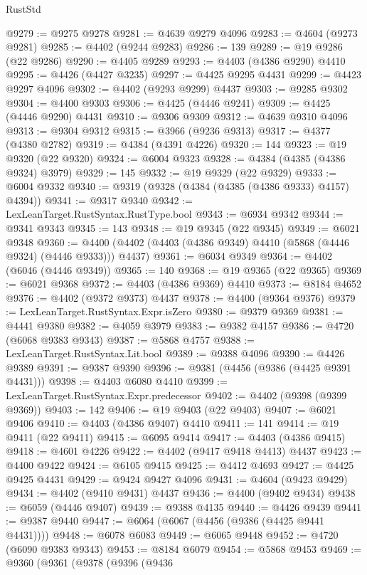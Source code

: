 \begin{lexlean}{RustStd}
\begin{coremodule}
@9279 := @9275 @9278
@9281 := @4639 @9279 @4096
@9283 := @4604 (@9273 @9281)
@9285 := @4402 (@9244 @9283)
@9286 := 139
@9289 := @19 @9286 (@22 @9286)
@9290 := @4405 @9289
@9293 := @4403 (@4386 @9290) @4410
@9295 := @4426 (@4427 @3235)
@9297 := @4425 @9295 @4431
@9299 := @4423 @9297 @4096
@9302 := @4402 (@9293 @9299) @4437
@9303 := @9285 @9302
@9304 := @4400 @9303
@9306 := @4425 (@4446 @9241)
@9309 := @4425 (@4446 @9290) @4431
@9310 := @9306 @9309
@9312 := @4639 @9310 @4096
@9313 := @9304 @9312
@9315 := @3966 (@9236 @9313)
@9317 := @4377 (@4380 @2782)
@9319 := @4384 (@4391 @4226)
@9320 := 144
@9323 := @19 @9320 (@22 @9320)
@9324 := @6004 @9323
@9328 := @4384 (@4385 (@4386 @9324) @3979)
@9329 := 145
@9332 := @19 @9329 (@22 @9329)
@9333 := @6004 @9332
@9340 := @9319 (@9328 (@4384 (@4385 (@4386 @9333) @4157) @4394))
@9341 := @9317 @9340
@9342 := LexLeanTarget.RustSyntax.RustType.bool
@9343 := @6934 @9342
@9344 := @9341 @9343
@9345 := 143
@9348 := @19 @9345 (@22 @9345)
@9349 := @6021 @9348
@9360 := @4400 (@4402 (@4403 (@4386 @9349) @4410 (@5868 (@4446 @9324) (@4446 @9333))) @4437)
@9361 := @6034 @9349
@9364 := @4402 (@6046 (@4446 @9349))
@9365 := 140
@9368 := @19 @9365 (@22 @9365)
@9369 := @6021 @9368
@9372 := @4403 (@4386 @9369) @4410
@9373 := @8184 @4652
@9376 := @4402 (@9372 @9373) @4437
@9378 := @4400 (@9364 @9376)
@9379 := LexLeanTarget.RustSyntax.Expr.isZero
@9380 := @9379 @9369
@9381 := @4441 @9380
@9382 := @4059 @3979
@9383 := @9382 @4157
@9386 := @4720 (@6068 @9383 @9343)
@9387 := @5868 @4757
@9388 := LexLeanTarget.RustSyntax.Lit.bool
@9389 := @9388 @4096
@9390 := @4426 @9389
@9391 := @9387 @9390
@9396 := @9381 (@4456 (@9386 (@4425 @9391 @4431)))
@9398 := @4403 @6080 @4410
@9399 := LexLeanTarget.RustSyntax.Expr.predecessor
@9402 := @4402 (@9398 (@9399 @9369))
@9403 := 142
@9406 := @19 @9403 (@22 @9403)
@9407 := @6021 @9406
@9410 := @4403 (@4386 @9407) @4410
@9411 := 141
@9414 := @19 @9411 (@22 @9411)
@9415 := @6095 @9414
@9417 := @4403 (@4386 @9415)
@9418 := @4601 @4226
@9422 := @4402 (@9417 @9418 @4413) @4437
@9423 := @4400 @9422
@9424 := @6105 @9415
@9425 := @4412 @4693
@9427 := @4425 @9425 @4431
@9429 := @9424 @9427 @4096
@9431 := @4604 (@9423 @9429)
@9434 := @4402 (@9410 @9431) @4437
@9436 := @4400 (@9402 @9434)
@9438 := @6059 (@4446 @9407)
@9439 := @9388 @4135
@9440 := @4426 @9439
@9441 := @9387 @9440
@9447 := @6064 (@6067 (@4456 (@9386 (@4425 @9441 @4431))))
@9448 := @6078 @6083
@9449 := @6065 @9448
@9452 := @4720 (@6090 @9383 @9343)
@9453 := @8184 @6079
@9454 := @5868 @9453
@9469 := @9360
    (@9361
      (@9378
        (@9396
          (@9436

\end{coremodule}
\end{lexlean}
